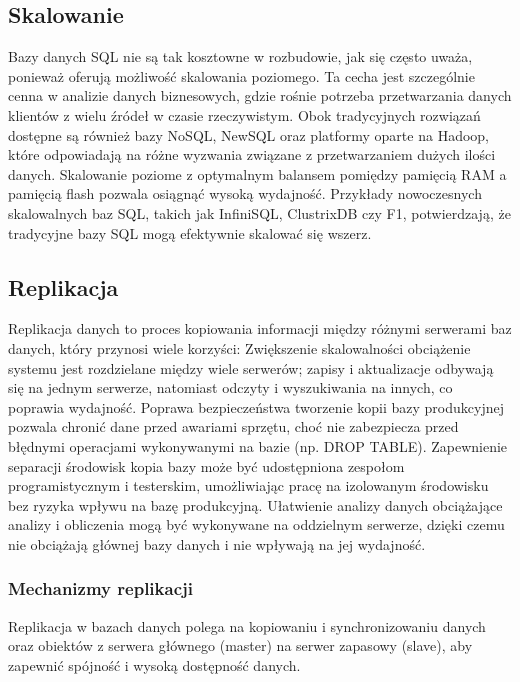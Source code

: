 \documentclass[letterpaper,10pt,polish]{sphinxmanual}
\begin{document}
\subsection{Skalowanie}
\label{\detokenize{rozdzial2/Wydajnosc_Skalowanie_i_Replikacja/index:skalowanie}}
\sphinxAtStartPar
Bazy danych SQL nie są tak kosztowne w rozbudowie, jak się często uważa, ponieważ oferują możliwość skalowania poziomego. Ta cecha jest szczególnie cenna w analizie danych biznesowych, gdzie rośnie potrzeba przetwarzania danych klientów z wielu źródeł w czasie rzeczywistym. Obok tradycyjnych rozwiązań dostępne są również bazy NoSQL, NewSQL oraz platformy oparte na Hadoop, które odpowiadają na różne wyzwania związane z przetwarzaniem dużych ilości danych. Skalowanie poziome z optymalnym balansem pomiędzy pamięcią RAM a pamięcią flash pozwala osiągnąć wysoką wydajność. Przykłady nowoczesnych skalowalnych baz SQL, takich jak InfiniSQL, ClustrixDB czy F1, potwierdzają, że tradycyjne bazy SQL mogą efektywnie skalować się wszerz.


\subsection{Replikacja}
\label{\detokenize{rozdzial2/Wydajnosc_Skalowanie_i_Replikacja/index:replikacja}}
\sphinxAtStartPar
Replikacja danych to proces kopiowania informacji między różnymi serwerami baz danych, który przynosi wiele korzyści:
\sphinxhyphen{} Zwiększenie skalowalności \textendash{} obciążenie systemu jest rozdzielane między wiele serwerów; zapisy i aktualizacje odbywają się na jednym serwerze, natomiast odczyty i wyszukiwania na innych, co poprawia wydajność.
\sphinxhyphen{} Poprawa bezpieczeństwa \textendash{} tworzenie kopii bazy produkcyjnej pozwala chronić dane przed awariami sprzętu, choć nie zabezpiecza przed błędnymi operacjami wykonywanymi na bazie (np. DROP TABLE).
\sphinxhyphen{} Zapewnienie separacji środowisk \textendash{} kopia bazy może być udostępniona zespołom programistycznym i testerskim, umożliwiając pracę na izolowanym środowisku bez ryzyka wpływu na bazę produkcyjną.
\sphinxhyphen{} Ułatwienie analizy danych \textendash{} obciążające analizy i obliczenia mogą być wykonywane na oddzielnym serwerze, dzięki czemu nie obciążają głównej bazy danych i nie wpływają na jej wydajność.


\subsubsection{Mechanizmy replikacji}
\label{\detokenize{rozdzial2/Wydajnosc_Skalowanie_i_Replikacja/index:mechanizmy-replikacji}}
\sphinxAtStartPar
Replikacja w bazach danych polega na kopiowaniu i synchronizowaniu danych oraz obiektów z serwera głównego (master) na serwer zapasowy (slave), aby zapewnić spójność i wysoką dostępność danych.
\end{document}
